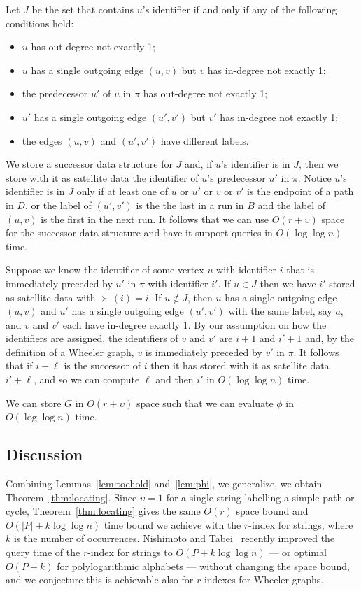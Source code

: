 Let $J$ be the set that contains $u$'s identifier if and only if any of the following conditions hold:
\begin{itemize}
\item $u$ has out-degree not exactly 1;
\item $u$ has a single outgoing edge $(u, v)$ but $v$ has in-degree not exactly 1;
\item the predecessor $u'$ of $u$ in $\pi$ has out-degree not exactly 1;
\item $u'$ has a single outgoing edge $(u', v')$ but $v'$ has in-degree not exactly 1;
\item the edges $(u, v)$ and $(u', v')$ have different labels.
\end{itemize}
We store a successor data structure for $J$ and, if $u$'s identifier is in $J$, then we store with it as satellite data the identifier of $u$'s predecessor $u'$ in $\pi$.  Notice $u$'s identifier is in $J$ only if at least one of $u$ or $u'$ or $v$ or $v'$ is the endpoint of a path in $D$, or the label of $(u', v')$ is the the last in a run in $B$ and the label of $(u, v)$ is the first in the next run.  It follows that we can use $O (r + \upsilon)$ space for the successor data structure and have it support queries in $O (\log \log n)$ time.

Suppose we know the identifier of some vertex $u$ with identifier $i$ that is immediately preceded by $u'$ in $\pi$ with identifier $i'$.  If $u \in J$ then we have $i'$ stored as satellite data with $\succ (i) = i$.  If $u \not \in J$, then $u$ has a single outgoing edge $(u, v)$ and $u'$ has a single outgoing edge $(u', v')$ with the same label, say $a$, and $v$ and $v'$ each have in-degree exactly 1.  By our assumption on how the identifiers are assigned, the identifiers of $v$ and $v'$ are $i + 1$ and $i' + 1$ and, by the definition of a Wheeler graph, $v$ is immediately preceded by $v'$ in $\pi$.  It follows that if $i + \ell$ is the successor of $i$ then it has stored with it as satellite data $i' + \ell$, and so we can compute $\ell$ and then $i'$ in $O (\log \log n)$ time.

\begin{lemma}
\label{lem:phi}
We can store $G$ in $O (r + \upsilon)$ space such that we can evaluate $\phi$ in $O (\log \log n)$ time.
\end{lemma}

\subsection{Discussion}
\label{subsec:discussion}

Combining Lemmas~\ref{lem:toehold} and~\ref{lem:phi}, we generalize, we obtain Theorem~\ref{thm:locating}.  Since $\upsilon = 1$ for a single string labelling a simple path or cycle, Theorem~\ref{thm:locating} gives the same $O (r)$ space bound and $O (|P| + k \log \log n)$ time bound we achieve with the $r$-index for strings, where $k$ is the number of occurrences.  Nishimoto and Tabei~\cite{nishimoto2020faster} recently improved the query time of the $r$-index for strings to $O (P + k \log \log n)$ --- or optimal $O (P + k)$ for polylogarithmic alphabets --- without changing the space bound, and we conjecture this is achievable also for $r$-indexes for Wheeler graphs.